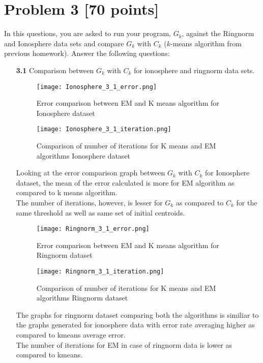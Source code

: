 \documentclass{article}
\begin{document}
\section*{Problem 3 [70 points]}

In this questions, you are asked to run your program, $G_k$, against the Ringnorm and Ionosphere data sets and compare $G_k$  with  $C_k$ ($k$-means algorithm from previous homework).  
Answer the following questions:

\begin{enumerate}
  \item[\textbf{3.1}]  Comparison between $G_k$  with  $C_k$ for ionosphere and ringnorm data sets. \\
    \begin{figure}[H]
       \texttt{[image: Ionosphere\_3\_1\_error.png]}
       \caption{Error comparison between EM and K means algorithm for Ionosphere dataset}
      \end{figure}

      \begin{figure}[H]
        \texttt{[image: Ionosphere\_3\_1\_iteration.png]}
        \caption{Comparison of number of iterations for K means and EM algorithms Ionosphere dataset}
      \end{figure}
      
      Looking at the error comparison graph between $G_k$  with  $C_k$ for Ionosphere dataset, the mean of the error calculated is more for EM algorithm as compared to k means algorithm. \\
      The number of iterations, however, is lesser for $G_k$ as compared to $C_k$ for the same threshold as well as same set of initial centroids.
      
    
    \begin{figure}[H]
      \texttt{[image: Ringnorm\_3\_1\_error.png]}
      \caption{Error comparison between EM and K means algorithm for Ringnorm dataset}
  	\end{figure}
    
    \begin{figure}[H]
      \texttt{[image: Ringnorm\_3\_1\_iteration.png]}
      \caption{Comparison of number of iterations for K means and EM algorithms Ringnorm dataset}
  	\end{figure}
    
    The graphs for ringnorm dataset comparing both the algorithms is similiar to the graphs generated for ionosphere data with error rate averaging higher as compared to kmeans average error. \\
    The number of iterations for EM in case of ringnorm data is lower as compared to kmeans.
  

\end{enumerate}
\end{document}
